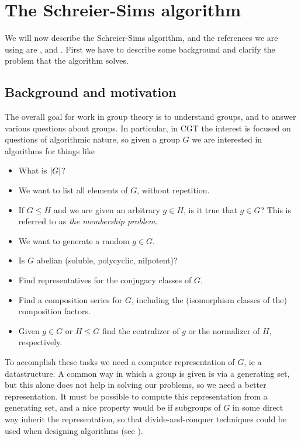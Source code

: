 \chapter{The Schreier-Sims algorithm}

We will now describe the Schreier-Sims algorithm, and the references we are using are \cite{soicher98}, \cite{seress03} and \cite{butler91}. First we have to describe some background and clarify the problem that the algorithm solves.

\section{Background and motivation} \label{ss_background}
The overall goal for work in group theory is to understand groups, and
to answer various questions about groups. In particular, in CGT the
interest is focused on questions of algorithmic nature, so given a
group $G$ we are interested in algorithms for things like
\begin{itemize}
\item What is $\left\lvert G \right\rvert$?
\item We want to list all elements of $G$, without repetition.
\item If $G \leq H$ and we are given an arbitrary $g \in H$, is it true that $g \in G$? This is referred to as \emph{the membership problem}.
\item We want to generate a random $g \in G$.
\item Is $G$ abelian (soluble, polycyclic, nilpotent)?
\item Find representatives for the conjugacy classes of $G$.
\item Find a composition series for $G$, including the (isomorphism classes of the) composition factors.
\item Given $g \in G$ or $H \leq G$ find the centralizer of $g$ or the normalizer of $H$, respectively.
\end{itemize}
To accomplish these tasks we need a computer representation of $G$, ie
a datastructure. A common way in which a group is given is via a
generating set, but this alone does not help in solving our problems,
so we need a better representation. It must be possible to compute
this representation from a generating set, and a nice property would
be if subgroups of $G$ in some direct way inherit the representation,
so that divide-and-conquer techniques could be used when designing
algorithms (see \cite{clr90}).

